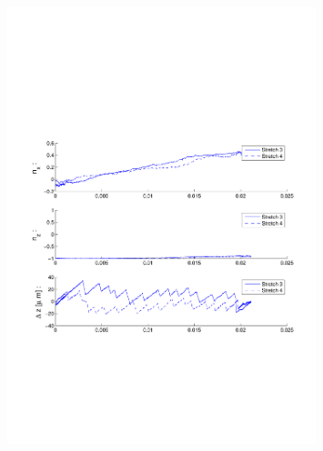 \begin{figure}[ H]

\centering

\includegraphics[width=0.8\textwidth]{Images/Particle 2/Stretch3.pdf}

\end{figure}

